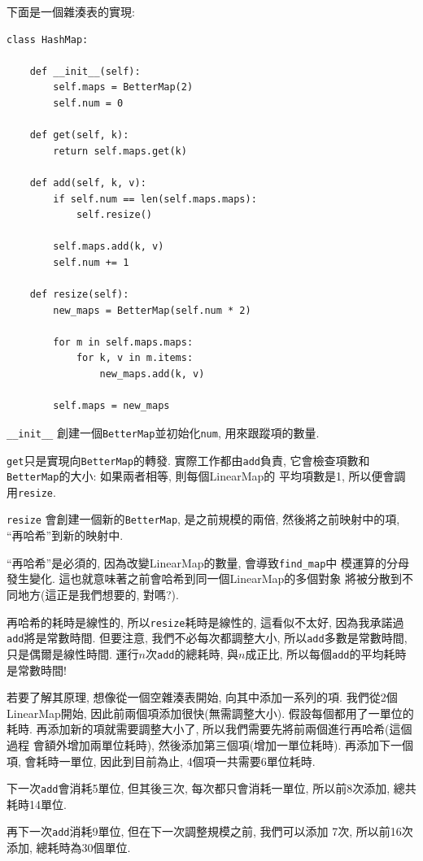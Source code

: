 \documentclass[10pt]{book}
\begin{document}
下面是一個雜湊表的實現:

\begin{verbatim}
class HashMap:

    def __init__(self):
        self.maps = BetterMap(2)
        self.num = 0

    def get(self, k):
        return self.maps.get(k)

    def add(self, k, v):
        if self.num == len(self.maps.maps):
            self.resize()

        self.maps.add(k, v)
        self.num += 1

    def resize(self):
        new_maps = BetterMap(self.num * 2)

        for m in self.maps.maps:
            for k, v in m.items:
                new_maps.add(k, v)

        self.maps = new_maps
\end{verbatim}

\verb"__init__" 創建一個{\tt BetterMap}並初始化{\tt num}, 用來跟蹤項的數量. 

{\tt get}只是實現向{\tt BetterMap}的轉發. 實際工作都由{\tt add}負責,
它會檢查項數和{\tt BetterMap}的大小: 如果兩者相等, 則每個LinearMap的
平均項數是1, 所以便會調用{\tt resize}.


{\tt resize} 會創建一個新的{\tt BetterMap}, 是之前規模的兩倍, 
然後將之前映射中的項, ``再哈希''到新的映射中.

``再哈希''是必須的, 因為改變LinearMap的數量, 會導致\verb"find_map"中
模運算的分母發生變化. 這也就意味著之前會哈希到同一個LinearMap的多個對象
將被分散到不同地方(這正是我們想要的, 對嗎?).

再哈希的耗時是線性的, 所以{\tt resize}耗時是線性的, 
這看似不太好, 因為我承諾過{\tt add}將是常數時間.
但要注意, 我們不必每次都調整大小, 所以{\tt add}多數是常數時間, 
只是偶爾是線性時間. 運行$n$次{\tt add}的總耗時, 與$n$成正比, 
所以每個{\tt add}的平均耗時是常數時間!

若要了解其原理, 想像從一個空雜湊表開始, 向其中添加一系列的項.
我們從2個LinearMap開始, 因此前兩個項添加很快(無需調整大小).
假設每個都用了一單位的耗時. 
再添加新的項就需要調整大小了, 所以我們需要先將前兩個進行再哈希(這個過程
會額外增加兩單位耗時), 然後添加第三個項(增加一單位耗時).
再添加下一個項, 會耗時一單位, 因此到目前為止, 4個項一共需要6單位耗時.

下一次{\tt add}會消耗5單位, 但其後三次, 每次都只會消耗一單位, 
所以前8次添加, 總共耗時14單位.

再下一次{\tt add}消耗9單位, 但在下一次調整規模之前, 我們可以添加
7次, 所以前16次添加, 總耗時為30個單位. 
\end{document}
